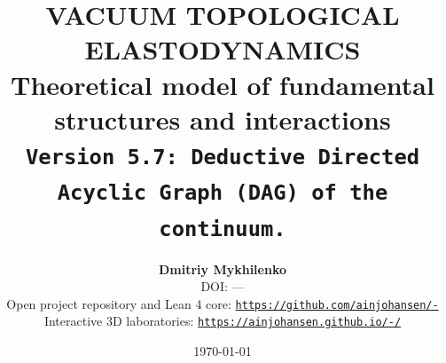 \documentclass[11pt,a4paper]{article}
\theoremstyle{definition}
\theoremstyle{remark}
\begin{document}
	
\title{\textbf{\Large VACUUM TOPOLOGICAL ELASTODYNAMICS}\\
\large Theoretical model of fundamental structures and interactions\\[2mm]
\small \texttt{Version 5.7: Deductive Directed Acyclic Graph (DAG) of the continuum.}}

\author{\textbf{Dmitriy Mykhilenko}\\[1mm]
\small DOI: ---\\
\small Open project repository and Lean 4 core: \href{https://github.com/ainjohansen/-}{\texttt{https://github.com/ainjohansen/-}}\\[0.5mm]
\small Interactive 3D laboratories: \href{https://ainjohansen.github.io/-/}{\texttt{https://ainjohansen.github.io/-/}}}

\date{\today}

\maketitle
\end{document}
